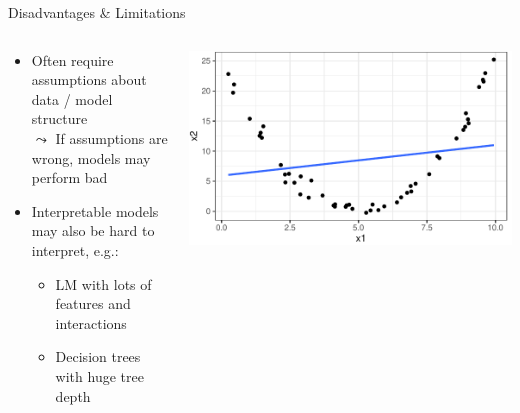 \documentclass[10pt,compress,t,notes=noshow, xcolor=table]{beamer}
\begin{document}
\begin{frame}{Disadvantages \& Limitations}
\begin{columns}[totalwidth=\textwidth]
\begin{column}{0.8\textwidth}
    \begin{itemize}%
    \itemsep1em
        \item<1-> Often require assumptions about data / model structure \\%
        $\leadsto$ If assumptions are wrong, models may perform bad 
        \item<2-> Interpretable models may also be hard to interpret, e.g.:
    \begin{itemize}
        \item LM with lots of features and interactions 
        \item Decision trees with huge tree depth
    \end{itemize}
    \end{itemize}
\end{column}
\begin{column}{0.2\textwidth}
    \begin{center}
        \includegraphics[width = \textwidth]{figure/lm_bad_fit.pdf} 
    \end{center}
\end{column}
\end{columns}
\quad \\


\end{frame}
\end{document}
